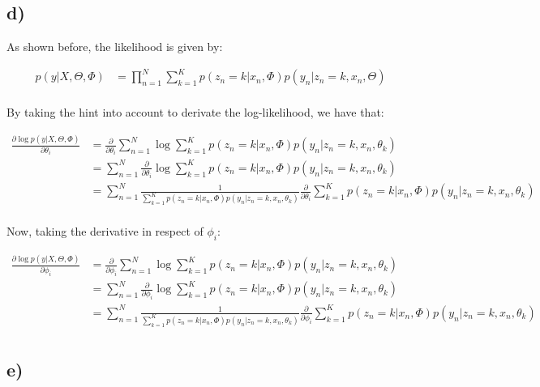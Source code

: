 \documentclass[12pt,a4paper,oneside]{paper}
\begin{document}
\subsection*{d)}

As shown before, the likelihood is given by:

\begin{align*}
    p(y | X, \Theta, \Phi) &= \prod_{n=1}^{N} \sum_{k=1}^{K} p(z_n = k | x_n, \Phi) p(y_n | z_n = k, x_n, \Theta) \\
\end{align*}

By taking the hint into account to derivate the log-likelihood, we have that:

\begin{align*}
    \frac{\partial \log p(y | X, \Theta, \Phi)}{\partial \theta_i} &= \frac{\partial}{\partial \theta_i} \sum_{n=1}^{N} \log \sum_{k=1}^{K} p(z_n = k | x_n, \Phi) p(y_n | z_n = k, x_n, \theta_k) \\
    &= \sum_{n=1}^{N} \frac{\partial}{\partial \theta_i} \log \sum_{k=1}^{K} p(z_n = k | x_n, \Phi) p(y_n | z_n = k, x_n, \theta_k) \\
    &= \sum_{n=1}^{N} \frac{1}{\sum_{k=1}^{K} p(z_n = k | x_n, \Phi) p(y_n | z_n = k, x_n, \theta_k)} \frac{\partial}{\partial \theta_i} \sum_{k=1}^{K} p(z_n = k | x_n, \Phi) p(y_n | z_n = k, x_n, \theta_k) \\
\end{align*}

Now, taking the derivative in respect of $\phi_i$:

\begin{align*}
    \frac{\partial \log p(y | X, \Theta, \Phi)}{\partial \phi_i} &= \frac{\partial}{\partial \phi_i} \sum_{n=1}^{N} \log \sum_{k=1}^{K} p(z_n = k | x_n, \Phi) p(y_n | z_n = k, x_n, \theta_k) \\
    &= \sum_{n=1}^{N} \frac{\partial}{\partial \phi_i} \log \sum_{k=1}^{K} p(z_n = k | x_n, \Phi) p(y_n | z_n = k, x_n, \theta_k) \\
    &= \sum_{n=1}^{N} \frac{1}{\sum_{k=1}^{K} p(z_n = k | x_n, \Phi) p(y_n | z_n = k, x_n, \theta_k)} \frac{\partial}{\partial \phi_i} \sum_{k=1}^{K} p(z_n = k | x_n, \Phi) p(y_n | z_n = k, x_n, \theta_k) \\
\end{align*}

\newpage
\subsection*{e)}
\end{document}
